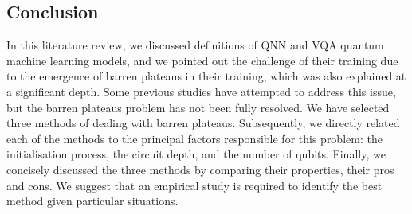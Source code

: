 \subsection{Conclusion}
In this literature review, we discussed definitions of QNN and VQA quantum machine learning models, and we pointed out the challenge of their training due to the emergence of barren plateaus in their training, which was also explained at a significant depth.
Some previous studies have attempted to address this issue, but the barren plateaus problem has not been fully resolved.
We have selected three methods of dealing with barren plateaus.
Subsequently, we directly related each of the methods to the principal factors responsible for this problem: the initialisation process, the circuit depth, and the number of qubits.
Finally, we concisely discussed the three methods by comparing their properties, their pros and cons.
We suggest that an empirical study is required to identify the best method given particular situations.